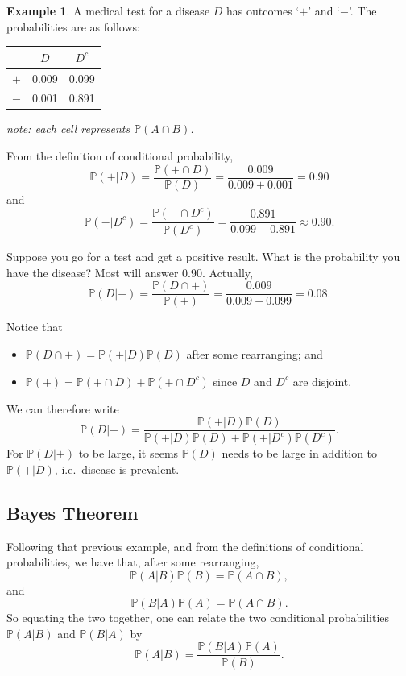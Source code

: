 \documentclass[
]{book}
\providecommand{\tightlist}{%
  \setlength{\itemsep}{0pt}\setlength{\parskip}{0pt}}
\newcommand{\bbP}{\mathbb{P}}
\theoremstyle{definition}
\theoremstyle{definition}
\newtheorem{example}{Example}[chapter]
\theoremstyle{definition}
\theoremstyle{definition}
\theoremstyle{remark}
\begin{document}
\begin{example}
A medical test for a disease \(D\) has outcomes `\(+\)' and `\(-\)'. The probabilities are as follows:

\begin{longtable}[]{@{}lcc@{}}
\toprule
& \(D\) & \(D^c\) \\
\midrule
\endhead
\(+\) & 0.009 & 0.099 \\
\(-\) & 0.001 & 0.891 \\
\bottomrule
\end{longtable}

\emph{note: each cell represents \(\bbP(A \cap B)\).}

From the definition of conditional probability,
\[
  \bbP(+|D) = \frac{\bbP(+ \cap D)}{\bbP(D)} = \frac{0.009}{0.009 + 0.001} = 0.90
\]
and
\[
  \bbP(-|D^c) = \frac{\bbP(- \cap D^c)}{\bbP(D^c)} = \frac{0.891}{0.099 + 0.891} \approx 0.90.
\]

Suppose you go for a test and get a positive result.
What is the probability you have the disease?
Most will answer 0.90.
Actually,
\[
  \bbP(D|+) = \frac{\bbP(D \cap +)}{\bbP(+)} = \frac{0.009}{0.009 + 0.099} = 0.08.
\]
\end{example}

Notice that

\begin{itemize}
\tightlist
\item
  \(\bbP(D \cap +) = \bbP(+|D)\bbP(D)\) after some rearranging; and
\item
  \(\bbP(+) = \bbP(+ \cap D) + \bbP(+ \cap D^c)\) since \(D\) and \(D^c\) are disjoint.
\end{itemize}

We can therefore write
\[
\bbP(D|+) = \frac{\bbP(+|D)\bbP(D)}{\bbP(+|D)\bbP(D) + \bbP(+|D^c)\bbP(D^c)}.
\]
For \(\bbP(D|+)\) to be large, it seems \(\bbP(D)\) needs to be large in addition to \(\bbP(+|D)\), i.e.~disease is prevalent.

\hypertarget{bayes-theorem}{%
\subsection{Bayes Theorem}\label{bayes-theorem}}

Following that previous example, and from the definitions of conditional probabilities, we have that, after some rearranging,
\[
\bbP(A | B)\bbP(B) = \bbP(A \cap B),
\]
and
\[
\bbP(B | A) \bbP(A)= \bbP(A \cap B).
\]
So equating the two together, one can relate the two conditional probabilities \(\bbP(A | B)\) and \(\bbP(B | A)\) by
\[
\bbP(A | B) = \frac{\bbP(B|A)\bbP(A)}{\bbP(B)}.
\]
\end{document}
